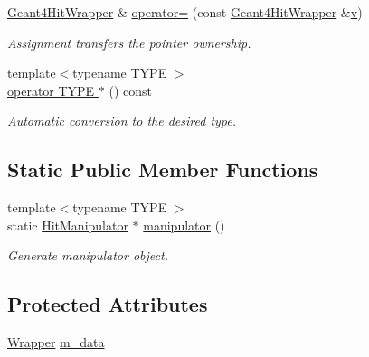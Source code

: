 \begin{DoxyCompactItemize}
\hyperlink{class_d_d4hep_1_1_simulation_1_1_geant4_hit_wrapper}{Geant4HitWrapper} \& \hyperlink{class_d_d4hep_1_1_simulation_1_1_geant4_hit_wrapper_a93a51629cca576b0ff7328981b7c71ad}{operator=} (const \hyperlink{class_d_d4hep_1_1_simulation_1_1_geant4_hit_wrapper}{Geant4HitWrapper} \&\hyperlink{_multi_view_8cpp_a8320ee13ac034dbf6d624fe8953dd337}{v})
\begin{DoxyCompactList}\small\item\em Assignment transfers the pointer ownership. \item\end{DoxyCompactList}\item 
{\footnotesize template$<$typename TYPE $>$ }\\\hyperlink{class_d_d4hep_1_1_simulation_1_1_geant4_hit_wrapper_ac06374f8717f37552b78d7adcfc29f7b}{operator TYPE $\ast$} () const 
\begin{DoxyCompactList}\small\item\em Automatic conversion to the desired type. \item\end{DoxyCompactList}\end{DoxyCompactItemize}
\subsection*{Static Public Member Functions}
\begin{DoxyCompactItemize}
\item 
{\footnotesize template$<$typename TYPE $>$ }\\static \hyperlink{class_d_d4hep_1_1_simulation_1_1_geant4_hit_wrapper_1_1_hit_manipulator}{HitManipulator} $\ast$ \hyperlink{class_d_d4hep_1_1_simulation_1_1_geant4_hit_wrapper_ad5159a11581cd209582a4fa3da961e71}{manipulator} ()
\begin{DoxyCompactList}\small\item\em Generate manipulator object. \item\end{DoxyCompactList}\end{DoxyCompactItemize}
\subsection*{Protected Attributes}
\begin{DoxyCompactItemize}
\item 
\hyperlink{class_d_d4hep_1_1_simulation_1_1_geant4_hit_wrapper_a4779e35eba7d553e0f2d497c49a42ec6}{Wrapper} \hyperlink{class_d_d4hep_1_1_simulation_1_1_geant4_hit_wrapper_a2344f57f3d02ecd148c2b4893dffe660}{m\_\-data}
\end{DoxyCompactItemize}


